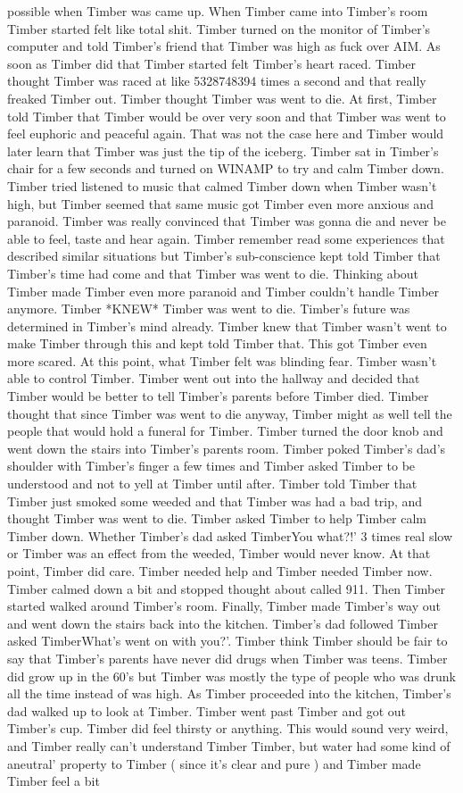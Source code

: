 \documentclass[12pt]{book}
\begin{document}
possible when Timber was came up. When Timber came into Timber's room Timber started felt like total shit. Timber turned on the monitor of Timber's computer and told Timber's friend that Timber was high as fuck over AIM. As soon as Timber did that Timber started felt Timber's heart raced. Timber thought Timber was raced at like 5328748394 times a second and that really freaked Timber out. Timber thought Timber was went to die. At first, Timber told Timber that Timber would be over very soon and that Timber was went to feel euphoric and peaceful again. That was not the case here and Timber would later learn that Timber was just the tip of the iceberg. Timber sat in Timber's chair for a few seconds and turned on WINAMP to try and calm Timber down. Timber tried listened to music that calmed Timber down when Timber wasn't high, but Timber seemed that same music got Timber even more anxious and paranoid. Timber was really convinced that Timber was gonna die and never be able to feel, taste and hear again. Timber remember read some experiences that described similar situations but Timber's sub-conscience kept told Timber that Timber's time had come and that Timber was went to die. Thinking about Timber made Timber even more paranoid and Timber couldn't handle Timber anymore. Timber *KNEW* Timber was went to die. Timber's future was determined in Timber's mind already. Timber knew that Timber wasn't went to make Timber through this and kept told Timber that. This got Timber even more scared. At this point, what Timber felt was blinding fear. Timber wasn't able to control Timber. Timber went out into the hallway and decided that Timber would be better to tell Timber's parents before Timber died. Timber thought that since Timber was went to die anyway, Timber might as well tell the people that would hold a funeral for Timber. Timber turned the door knob and went down the stairs into Timber's parents room. Timber poked Timber's dad's shoulder with Timber's finger a few times and Timber asked Timber to be understood and not to yell at Timber until after. Timber told Timber that Timber just smoked some weeded and that Timber was had a bad trip, and thought Timber was went to die. Timber asked Timber to help Timber calm Timber down. Whether Timber's dad asked TimberYou what?!' 3 times real slow or Timber was an effect from the weeded, Timber would never know. At that point, Timber did care. Timber needed help and Timber needed Timber now. Timber calmed down a bit and stopped thought about called 911. Then Timber started walked around Timber's room. Finally, Timber made Timber's way out and went down the stairs back into the kitchen. Timber's dad followed Timber asked TimberWhat's went on with you?'. Timber think Timber should be fair to say that Timber's parents have never did drugs when Timber was teens. Timber did grow up in the 60's but Timber was mostly the type of people who was drunk all the time instead of was high. As Timber proceeded into the kitchen, Timber's dad walked up to look at Timber. Timber went past Timber and got out Timber's cup. Timber did feel thirsty or anything. This would sound very weird, and Timber really can't understand Timber Timber, but water had some kind of aneutral' property to Timber ( since it's clear and pure ) and Timber made Timber feel a bit 
\end{document}
